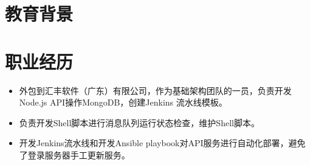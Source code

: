 \documentclass{resume}
\begin{document}






\section{教育背景}









\section{职业经历}

\begin{itemize}[parsep=0.5ex]
  \item 外包到汇丰软件（广东）有限公司，作为基础架构团队的一员，负责开发Node.js API操作MongoDB，创建Jenkins 流水线模板。
  \item 负责开发Shell脚本进行消息队列运行状态检查，维护Shell脚本。
  \item 开发Jenkins流水线和开发Ansible playbook对API服务进行自动化部署，避免了登录服务器手工更新服务。
\end{itemize}
\end{document}
